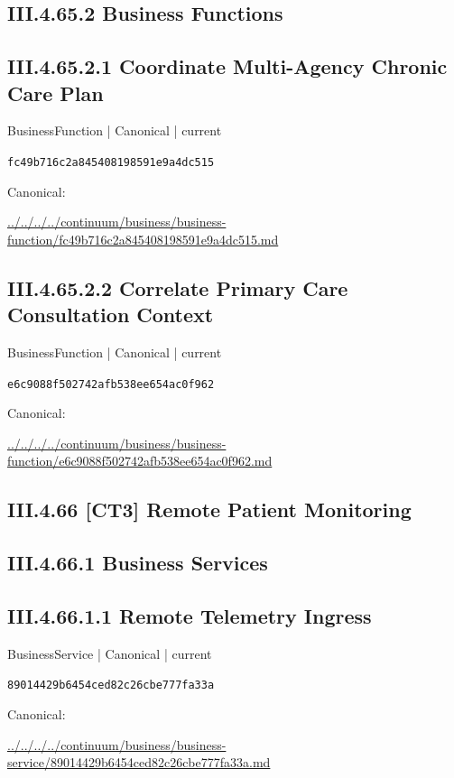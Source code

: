 \documentclass[10pt,a4paper]{article}
\begin{document}
\subsection*{III.4.65.2 Business Functions}
\subsection*{III.4.65.2.1 Coordinate Multi-Agency Chronic Care Plan}
{\small BusinessFunction | Canonical | current}\par
\texttt{fc49b716c2a845408198591e9a4dc515}\par
Canonical: \par
{\footnotesize\url{../../../../continuum/business/business-function/fc49b716c2a845408198591e9a4dc515.md}}\par
\subsection*{III.4.65.2.2 Correlate Primary Care Consultation Context}
{\small BusinessFunction | Canonical | current}\par
\texttt{e6c9088f502742afb538ee654ac0f962}\par
Canonical: \par
{\footnotesize\url{../../../../continuum/business/business-function/e6c9088f502742afb538ee654ac0f962.md}}\par
\subsection*{III.4.66 [CT3] Remote Patient Monitoring}
\subsection*{III.4.66.1 Business Services}
\subsection*{III.4.66.1.1 Remote Telemetry Ingress}
{\small BusinessService | Canonical | current}\par
\texttt{89014429b6454ced82c26cbe777fa33a}\par
Canonical: \par
{\footnotesize\url{../../../../continuum/business/business-service/89014429b6454ced82c26cbe777fa33a.md}}\par
\end{document}
